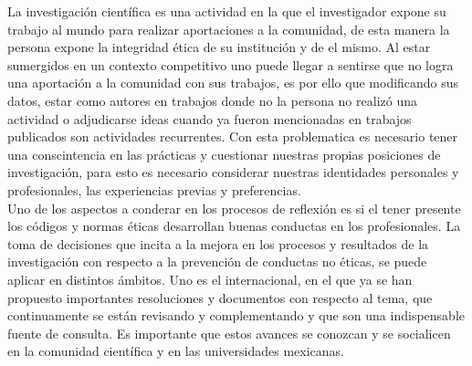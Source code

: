 La investigación científica es una actividad en la que el investigador expone su trabajo al mundo para
realizar aportaciones a la comunidad, de esta manera la persona expone la integridad ética de su institución
y de el mismo. Al estar sumergidos en un contexto competitivo uno puede llegar a sentirse que no logra una 
aportación a la comunidad con sus trabajos, es por ello que modificando sus datos, estar como autores en trabajos
donde no la persona no realizó una actividad o adjudicarse ideas cuando ya fueron mencionadas en trabajos publicados
son actividades recurrentes. Con esta problematica es necesario tener una conscintencia en las prácticas y 
cuestionar nuestras propias posiciones de investigación, para esto es necesario considerar nuestras identidades 
personales y profesionales, las experiencias previas y preferencias.\\
Uno de los aspectos a conderar en los procesos de reflexión es si el tener presente los códigos y normas éticas
desarrollan buenas conductas en los profesionales. La toma de decisiones que incita a la mejora en los procesos
y resultados de la investigación con respecto a la prevención de conductas no éticas, se puede aplicar en distintos
ámbitos. Uno es el internacional, en el que ya se han propuesto importantes resoluciones y documentos con respecto
al tema, que continuamente se están revisando y complementando y que son una indispensable fuente de consulta.
Es importante que estos avances se conozcan y se socialicen en la comunidad científica y en las universidades mexicanas.
